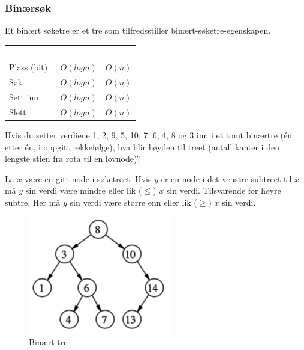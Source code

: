 \subsubsection{Binærsøk}
Et binært søketre er et tre som tilfredsstiller binært-søketre-egenskapen.

\begin{table}[H]
    \label{tab:binaert}
    \centering
    \begin{tabular}{|L{10em} | L{10em}| L{10em}|}
        \hline
        \textbf{\textcolor{white}{Operasjon}} & \textbf{\textcolor{white}{Average}} & \textbf{\textcolor{white}{Worst}}\\
        Plass (bit) & $O(log n)$ & $O(n)$\\
        Søk & $O(log n)$ & $O(n)$ \\
        Sett inn & $O(log n)$ & $O(n)$ \\
        Slett & $O(log n)$ & $O(n)$ \\
         \hline
    \end{tabular}
\end{table}

\begin{boxed}
Hvis du setter verdiene 1, 2, 9, 5, 10, 7, 6, 4, 8 og 3 inn i et tomt binærtre (én etter én, i oppgitt rekkefølge), hva blir høyden til treet (antall kanter i den lengste stien fra rota til en løvnode)?
\newline{}
\end{boxed}

\begin{boxed}
La $x$ være en gitt node i søketreet. Hvis $y$ er en node i det venstre subtreet til $x$ må $y$ sin verdi være mindre eller lik ($\leq$) $x$ sin verdi. Tilsvarende for høyre subtre. Her må $y$ sin verdi være større enn eller lik ($\geq$) $x$ sin verdi.

\begin{figure}[H]
\includegraphics[scale=0.7]{images/binaer}
\centering %
\caption{Binært tre}
\label{fig:binaer}
\end{figure}
\end{boxed}

